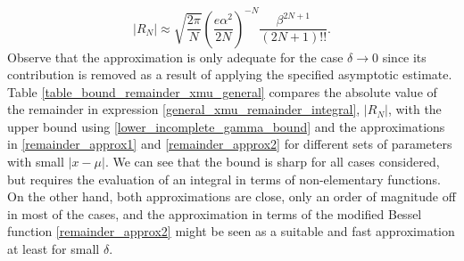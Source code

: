 \documentclass[10pt,a4paper,oneside]{article}
\numberwithin{equation}{section}
\begin{document}
\begin{equation}
|R_N| \approx \sqrt{\frac{2\pi}{N}} \left(\frac{e\alpha^2}{2N}\right)^{-N} \frac{\beta^{2N + 1}}{(2N + 1)!!}.
\end{equation}
Observe that the approximation is only adequate for the case $\delta \to 0$ since its contribution is removed as a result of applying the specified asymptotic estimate. Table \ref{table_bound_remainder_xmu_general} compares the absolute value of the remainder in expression \eqref{general_xmu_remainder_integral}, $|R_N|$, with the upper bound using \eqref{lower_incomplete_gamma_bound} and the approximations in \eqref{remainder_approx1} and \eqref{remainder_approx2} for different sets of parameters with small $|x-\mu|$. We can see that the bound is sharp for all cases considered, but requires the evaluation of an integral in terms of non-elementary functions. On the other hand, both approximations are close, only an order of magnitude off in most of the cases, and the approximation in terms of the modified Bessel function \eqref{remainder_approx2} might be seen as a suitable and fast approximation at least for small $\delta$.

\begin{table}[H]
	\centering
	\caption{Comparison of various approximations (\eqref{remainder_approx1} and \eqref{remainder_approx2}) and the upper bound \eqref{lower_incomplete_gamma_bound} for the estimation of the remainder \eqref{general_xmu_remainder_integral}.}
	\label{table_bound_remainder_xmu_general}
\end{table}
\end{document}

